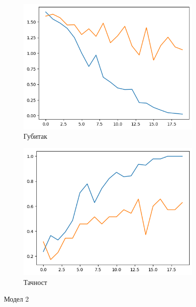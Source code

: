\documentclass{article}
\begin{document}
\begin{figure}[htbp]
  \centering
  \begin{subfigure}{0.45\textwidth}
    \centering
    \includegraphics[width=\linewidth]{slike/2loss.png} %
    \caption{Губитак}
    \label{fig:slika3}
  \end{subfigure}
  \hfill
  \begin{subfigure}{0.45\textwidth}
    \centering
    \includegraphics[width=\linewidth]{slike/2acc.png} %
    \caption{Тачност}
    \label{fig:slika4}
  \end{subfigure}
  \caption{Модел 2}
  \label{fig:zajednicki_naslov1}
\end{figure}
\end{document}
